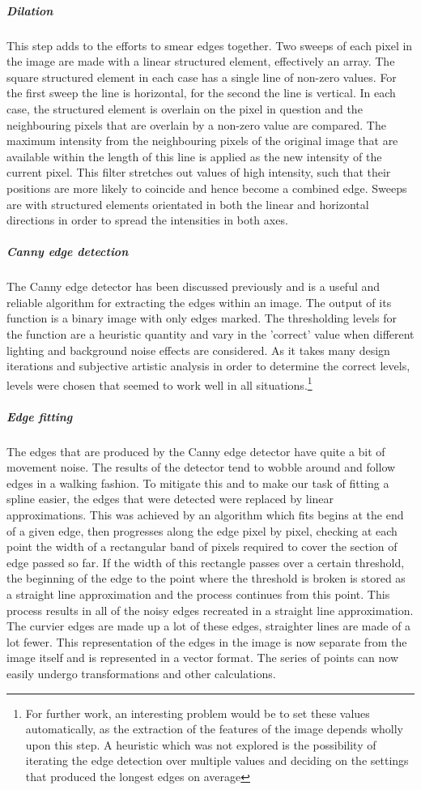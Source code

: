 \subparagraph{Dilation}
This step adds to the efforts to smear edges together. Two sweeps of each pixel in the image are made with a linear structured element, effectively an array. The square structured element in each case has a single line of non-zero values. For the first sweep the line is horizontal, for the second the line is vertical. In each case, the structured element is overlain on the pixel in question and the neighbouring pixels that are overlain by a non-zero value are compared. The maximum intensity from the neighbouring pixels of the original image that are available within the length of this line is applied as the new intensity of the current pixel. This filter stretches out values of high intensity, such that their positions are more likely to coincide and hence become a combined edge. Sweeps are with structured elements orientated in both the linear and horizontal directions in order to spread the intensities in both axes.
\subparagraph{Canny edge detection}
The Canny edge detector has been discussed previously and is a useful and reliable algorithm for extracting the edges within an image. The output of its function is a binary image with only edges marked. The thresholding levels for the function are a heuristic quantity and vary in the 'correct' value when different lighting and background noise effects are considered. As it takes many design iterations and subjective artistic analysis in order to determine the correct levels, levels were chosen that seemed to work well in all situations.\footnote{For further work, an interesting problem would be to set these values automatically, as the extraction of the features of the image depends wholly upon this step. A heuristic which was not explored is the possibility of iterating the edge detection over multiple values and deciding on the settings that produced the longest edges on average}
\subparagraph{Edge fitting}
The edges that are produced by the Canny edge detector have quite a bit of movement noise. The results of the detector tend to wobble around and follow edges in a walking fashion. To mitigate this and to make our task of fitting a spline easier, the edges that were detected were replaced by linear approximations. This was achieved by an algorithm which fits begins at the end of a given edge, then progresses along the edge pixel by pixel, checking at each point the width of a rectangular band of pixels required to cover the section of edge passed so far. If the width of this rectangle passes over a certain threshold, the beginning of the edge to the point where the threshold is broken is stored as a straight line approximation and the process continues from this point. This process results in all of the noisy edges recreated in a straight line approximation. The curvier edges are made up a lot of these edges, straighter lines are made of a lot fewer. This representation of the edges in the image is now separate from the image itself and is represented in a vector format. The series of points can now easily undergo transformations and other calculations. 
